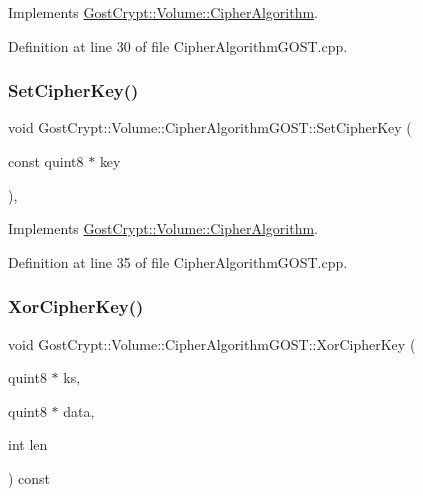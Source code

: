 Implements \hyperlink{class_gost_crypt_1_1_volume_1_1_cipher_algorithm_a8d39c267bba1bea5b7e51b803d426b9c}{Gost\+Crypt\+::\+Volume\+::\+Cipher\+Algorithm}.



Definition at line 30 of file Cipher\+Algorithm\+G\+O\+S\+T.\+cpp.

\mbox{\label{class_gost_crypt_1_1_volume_1_1_cipher_algorithm_g_o_s_t_ac2ccc5e5b4afa45c64775d5e296b8a91}} 
\subsubsection{\texorpdfstring{Set\+Cipher\+Key()}{SetCipherKey()}}
{\footnotesize\ttfamily void Gost\+Crypt\+::\+Volume\+::\+Cipher\+Algorithm\+G\+O\+S\+T\+::\+Set\+Cipher\+Key (\begin{DoxyParamCaption}\item[{const quint8 $\ast$}]{key }\end{DoxyParamCaption})\hspace{0.3cm}{\ttfamily [protected]}, {\ttfamily [virtual]}}



Implements \hyperlink{class_gost_crypt_1_1_volume_1_1_cipher_algorithm_a98760f7a389f6fb5fd1d2078d0c1580f}{Gost\+Crypt\+::\+Volume\+::\+Cipher\+Algorithm}.



Definition at line 35 of file Cipher\+Algorithm\+G\+O\+S\+T.\+cpp.

\mbox{\label{class_gost_crypt_1_1_volume_1_1_cipher_algorithm_g_o_s_t_a0cc29efdab0704c4d7211988f8303a15}} 
\subsubsection{\texorpdfstring{Xor\+Cipher\+Key()}{XorCipherKey()}}
{\footnotesize\ttfamily void Gost\+Crypt\+::\+Volume\+::\+Cipher\+Algorithm\+G\+O\+S\+T\+::\+Xor\+Cipher\+Key (\begin{DoxyParamCaption}\item[{quint8 $\ast$}]{ks,  }\item[{quint8 $\ast$}]{data,  }\item[{int}]{len }\end{DoxyParamCaption}) const\hspace{0.3cm}{\ttfamily [virtual]}}



